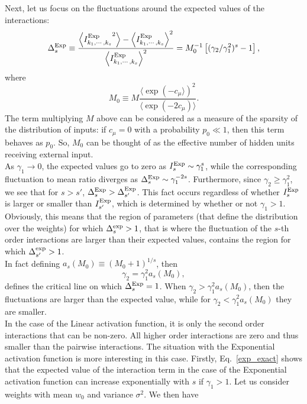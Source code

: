 \documentclass[11pt,letterpaper]{article}
\begin{document}
Next, let us focus on the fluctuations around the expected values of the interactions:
\begin{equation*}
\Delta^{\rm Exp}_{s}\equiv \frac{\left \langle {I^{\rm Exp}_{k_1,\cdots, k_s}}^2 \right \rangle - \left \langle I^{\rm Exp}_{k_1,\cdots, k_{s}} \right \rangle^2}{\left \langle I^{\rm Exp}_{k_1,\cdots, k_{s}} \right \rangle^2} = M^{-1}_0
\left [(\gamma_2/\gamma^2_1)^{s}-1\right] ,
\end{equation*}
where 
\begin{equation*}
M_0 \equiv M \frac{\langle \exp(-c_{\mu}\rangle)^2}{\langle \exp(-2c_{\mu}) \rangle}.
\end{equation*}
The term multiplying $M$ above can be considered as a measure of the sparsity of the distribution of inputs: if $c_{\mu} = 0$ with a probability $p_0\ll 1$, then this term behaves as $p_0$. So, $M_0$ can be thought of as the effective number of hidden units receiving external input.\\
As $\gamma_1\to 0$, the expected values go to zero as $I^{\rm Exp}_s \sim \gamma^s_1$, while the corresponding fluctuation to mean ratio diverges as $\Delta^{\rm Exp}_s\sim \gamma^{-2s}_1$.
Furthermore, since $\gamma_2\ge \gamma^2_1$, we see that for $s>s'$, $\Delta^{\rm Exp}_s>\Delta^{\rm Exp}_{s'}$. This fact occurs regardless of whether $I^{\rm Exp}_{s}$ is larger or smaller than $I^{\rm Exp}_{s'}$, which is determined by whether or not $\gamma_1>1$. Obviously, this means that the region of parameters (that define the distribution over the weights) for which $\Delta^{\rm exp}_{s}>1$, that is where the fluctuation of the $s$-th order interactions are larger than their expected values, contains the region for which $\Delta^{\rm exp}_{s'}>1$.\\  
In fact defining $a_s(M_0)\equiv(M_0+1)^{1/s}$, then
\begin{equation*}
\gamma_2 = \gamma^2_1 a_s(M_0),
\end{equation*}
defines the critical line on which $\Delta^{\rm Exp}_{s}=1$. When $\gamma_2 > \gamma^2_1 a_s(M_0)$, then the fluctuations are larger than the expected value, while for $\gamma_2 < \gamma^2_1  a_s(M_0)$ they are smaller. \\
In the case of the Linear activation function, it is only the second order interactions that can be non-zero. All higher order interactions are zero and thus smaller than the pairwise interactions. The situation with the Exponential activation function is more interesting in this case. Firstly,  Eq.~\eqref{exp_exact} shows that the expected value of the interaction term in the case of the Exponential activation function can increase exponentially with $s$ if $\gamma_1>1$. Let us consider weights with mean $w_0$ and variance $\sigma^2$. We then have 
\end{document}

